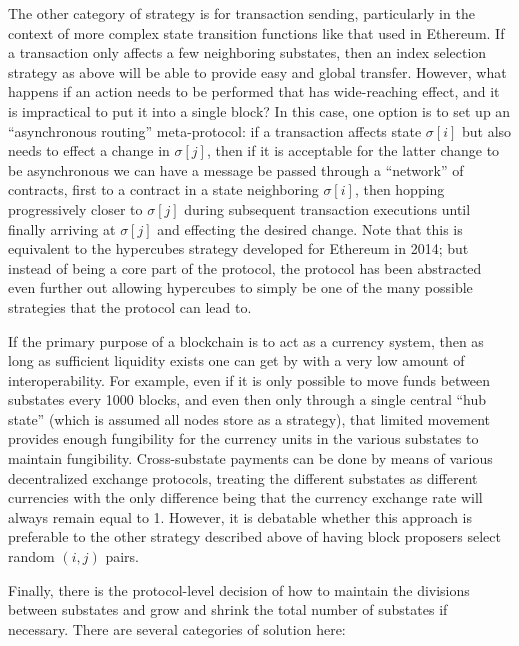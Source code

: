 \documentclass[11pt,a4paper]{report}
\theoremstyle{plain}
\theoremstyle{definition}
\theoremstyle{remark}
\begin{document}
The other category of strategy is for transaction sending, particularly in the context of more complex state transition functions like that used in Ethereum. If a transaction only affects a few neighboring substates, then an index selection strategy as above will be able to provide easy and global transfer. However, what happens if an action needs to be performed that has wide-reaching effect, and it is impractical to put it into a single block? In this case, one option is to set up an ``asynchronous routing'' meta-protocol: if a transaction affects state $\sigma[i]$ but also needs to effect a change in $\sigma[j]$, then if it is acceptable for the latter change to be asynchronous we can have a message be passed through a ``network'' of contracts, first to a contract in a state neighboring $\sigma[i]$, then hopping progressively closer to $\sigma[j]$ during subsequent transaction executions until finally arriving at $\sigma[j]$ and effecting the desired change. Note that this is equivalent to the hypercubes \cite{hypercubes} strategy developed for Ethereum in 2014; but instead of being a core part of the protocol, the protocol has been abstracted even further out allowing hypercubes to simply be one of the many possible strategies that the protocol can lead to.

If the primary purpose of a blockchain is to act as a currency system, then as long as sufficient liquidity exists one can get by with a very low amount of interoperability. For example, even if it is only possible to move funds between substates every 1000 blocks, and even then only through a single central ``hub state'' (which is assumed all nodes store as a strategy), that limited movement provides enough fungibility for the currency units in the various substates to maintain fungibility. Cross-substate payments can be done by means of various decentralized exchange protocols, treating the different substates as different currencies with the only difference being that the currency exchange rate will always remain equal to 1. However, it is debatable whether this approach is preferable to the other strategy described above of having block proposers select random $(i, j)$ pairs.

Finally, there is the protocol-level decision of how to maintain the divisions between substates and grow and shrink the total number of substates if necessary. There are several categories of solution here:
\end{document}
